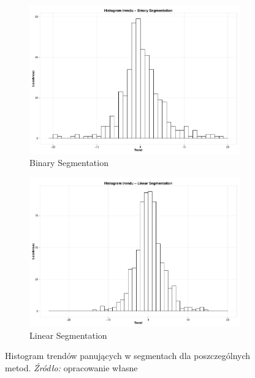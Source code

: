\documentclass[polish, twoside, 12pt, a4paper]{article}
\theoremstyle{definition}
\theoremstyle{plain}
\theoremstyle{remark}
\begin{document}
\begin{figure}[H]
  \centering
  \begin{subfigure}[t]{0.45\textwidth}
    \includegraphics[width=\textwidth]{./rys008}
    \caption{Binary Segmentation}
    \label{xxxc}
  \end{subfigure}
  \hfill
  \begin{subfigure}[t]{0.45\textwidth}
    \includegraphics[width=\textwidth]{./rys009}
    \caption{Linear Segmentation}
    \label{xxxd}
  \end{subfigure}
  \captionsetup{margin=10pt,font=small,labelfont=bf,width=.8\textwidth}
  \caption[Histogram trendów panujących w segmentach dla segmentacji liniowej oraz binarnej]{Histogram trendów panujących w segmentach dla poszczególnych metod. \textit{Źródło:} opracowanie własne}\label{rys019}
\end{figure}
\end{document}

